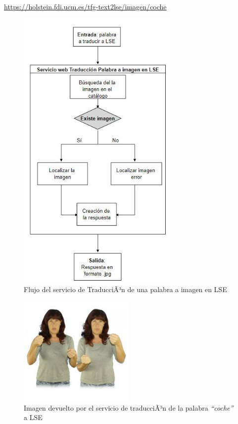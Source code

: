\begin{shaded}
	\url{https://holstein.fdi.ucm.es/tfg-text2lse/imagen/coche }	
\end{shaded}


\begin{figure}[]
	\centering
	\includegraphics[width=0.7\textwidth]{Imagenes/Fuentes/Text2LSE/FlujoImagen1palabra.jpg}
	\caption{Flujo del servicio de TraducciÃ³n de una palabra a imagen en LSE}
	\label {fig: imgFlujo1palabraImagenText2LSE}
\end{figure}

\begin{figure}[]
	\centering
	\includegraphics[width=0.5\textwidth]{Imagenes/Fuentes/Text2LSE/imagenEjemplo.jpg}
	\caption{Imagen devuelto por el servicio de traducciÃ³n de la palabra \textit{``coche''} a LSE}
	\label {fig: imgCoche}
\end{figure}


